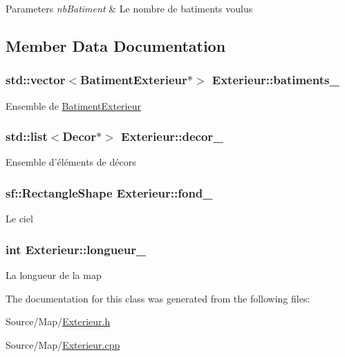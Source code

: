 \begin{DoxyParams}{Parameters}
{\em nb\-Batiment} & Le nombre de batiments voulus \\
\hline
\end{DoxyParams}


\subsection{Member Data Documentation}
\hypertarget{classExterieur_a172e012b882189a95932a48f15338f3b}{
\subsubsection[{batiments\-\_\-}]{\setlength{\rightskip}{0pt plus 5cm}std\-::vector$<${\bf Batiment\-Exterieur}$\ast$$>$ Exterieur\-::batiments\-\_\-\hspace{0.3cm}{\ttfamily [private]}}}\label{classExterieur_a172e012b882189a95932a48f15338f3b}
Ensemble de \hyperlink{classBatimentExterieur}{Batiment\-Exterieur} \hypertarget{classExterieur_af1e89656a647fc1bfc179c4910a7f40d}{
\subsubsection[{decor\-\_\-}]{\setlength{\rightskip}{0pt plus 5cm}std\-::list$<${\bf Decor}$\ast$$>$ Exterieur\-::decor\-\_\-\hspace{0.3cm}{\ttfamily [private]}}}\label{classExterieur_af1e89656a647fc1bfc179c4910a7f40d}
Ensemble d'éléments de décors \hypertarget{classExterieur_a32c931a8689eb6b937049c23a1b5c3e6}{
\subsubsection[{fond\-\_\-}]{\setlength{\rightskip}{0pt plus 5cm}sf\-::\-Rectangle\-Shape Exterieur\-::fond\-\_\-\hspace{0.3cm}{\ttfamily [private]}}}\label{classExterieur_a32c931a8689eb6b937049c23a1b5c3e6}
Le ciel \hypertarget{classExterieur_a99f4d23bbf9ed4df9e4e091acacd3d5f}{
\subsubsection[{longueur\-\_\-}]{\setlength{\rightskip}{0pt plus 5cm}int Exterieur\-::longueur\-\_\-\hspace{0.3cm}{\ttfamily [private]}}}\label{classExterieur_a99f4d23bbf9ed4df9e4e091acacd3d5f}
La longueur de la map 

The documentation for this class was generated from the following files\-:\begin{DoxyCompactItemize}
\item 
Source/\-Map/\hyperlink{Exterieur_8h}{Exterieur.\-h}\item 
Source/\-Map/\hyperlink{Exterieur_8cpp}{Exterieur.\-cpp}\end{DoxyCompactItemize}
